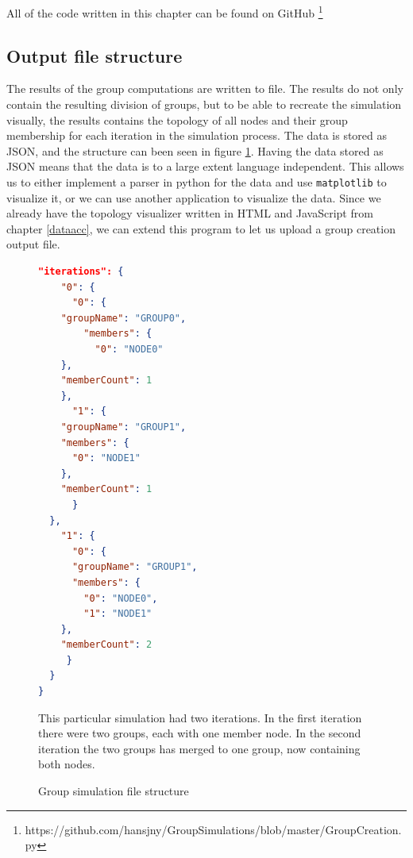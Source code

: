 All of the code written in this chapter can be found on GitHub \footnote{https://github.com/hansjny/GroupSimulations/blob/master/GroupCreation.py}

\subsection{Output file structure}
The results of the group computations are written to file. The results do not only contain the resulting division of groups, but to be able to recreate the simulation
visually, the results contains the topology of all nodes and their group membership for each iteration in the simulation process. 
The data is stored as JSON, and the structure can been seen in figure \ref{fig:jsongroup}.
Having the data stored as JSON means that the data is to a large extent language independent.
This allows us to either implement a parser in python for the data and use \verb|matplotlib| to visualize it,
or we can use another application to visualize the data. Since we already have the topology visualizer
written in HTML and JavaScript from chapter \ref{dataacc}, we can extend this program to let us upload a group creation output file. 
		\begin{figure}

\begin{minipage}{\linewidth}
\begin{lstlisting}[language=json]
  "iterations": {
    "0": {
      "0": {
	"groupName": "GROUP0",
        "members": {
          "0": "NODE0"
	},
	"memberCount": 1
    },
      "1": {
	"groupName": "GROUP1",
	"members": {
	  "0": "NODE1"
	},
	"memberCount": 1
      }
  },
    "1": {
      "0": {
	  "groupName": "GROUP1",
	  "members": {
	    "0": "NODE0",
	    "1": "NODE1"
	},
	"memberCount": 2
     }
  }
}
\end{lstlisting}
\end{minipage}

\caption{Group simulation file structure}
\medskip
\small
This particular simulation had two iterations. In the first iteration there were two groups, each with one member node. In the second iteration the two groups has merged to one group, now
containing both nodes. 
\label{fig:jsongroup}
\end{figure}




